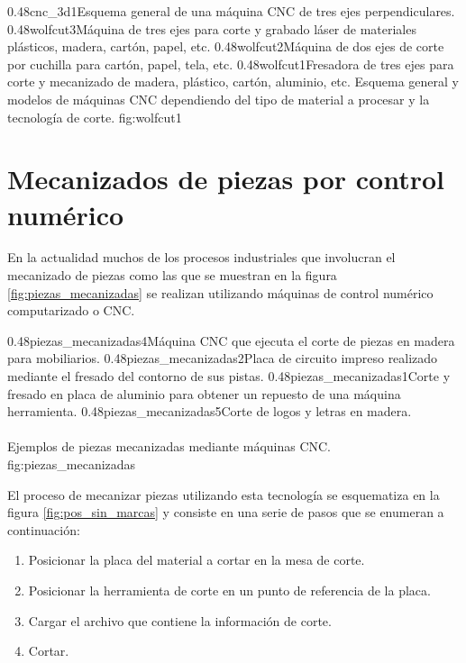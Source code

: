 \subfigtwotwo
            {0.48}{cnc_3d1}{Esquema general de una máquina CNC de tres ejes perpendiculares.\\ \vphantom{1}}
            {0.48}{wolfcut3}{Máquina de tres ejes para corte y grabado láser de materiales plásticos, madera, cartón, papel, etc.}
            {0.48}{wolfcut2}{Máquina de dos ejes de corte por cuchilla para cartón, papel, tela, etc.}
            {0.48}{wolfcut1}{Fresadora de tres ejes para corte y mecanizado de madera, plástico, cartón, aluminio, etc.}
            {Esquema general y modelos de máquinas CNC dependiendo del tipo de material a procesar y la tecnología de corte.}
            {fig:wolfcut1}


\section{Mecanizados de piezas por control numérico}

En la actualidad muchos de los procesos industriales que involucran el mecanizado de piezas como las que se muestran en la figura \ref{fig:piezas_mecanizadas} se realizan utilizando máquinas de control numérico computarizado o CNC.

\subfigtwotwo 
         {0.48}{piezas_mecanizadas4}{Máquina CNC que ejecuta el corte de piezas en madera para mobiliarios.} 
         {0.48}{piezas_mecanizadas2}{Placa de circuito impreso realizado mediante el fresado del contorno de sus pistas.}
         {0.48}{piezas_mecanizadas1}{Corte y fresado en placa de aluminio para obtener un repuesto de una máquina herramienta.}
         {0.48}{piezas_mecanizadas5}{Corte de logos y letras en madera. \\ \vphantom{10}\\ \vphantom{10}}
         {Ejemplos de piezas mecanizadas mediante máquinas CNC.}
         {fig:piezas_mecanizadas}


         El proceso de mecanizar piezas utilizando esta tecnología se esquematiza en la figura \ref{fig:pos_sin_marcas} y consiste en una serie de pasos que se enumeran a continuación:

\begin{enumerate}
   \item{Posicionar la placa del material a cortar en la mesa de corte.}
   \item{Posicionar la herramienta de corte en un punto de referencia de la placa.}
   \item{Cargar el archivo que contiene la información de corte.}
   \item{Cortar.}
\end{enumerate}

